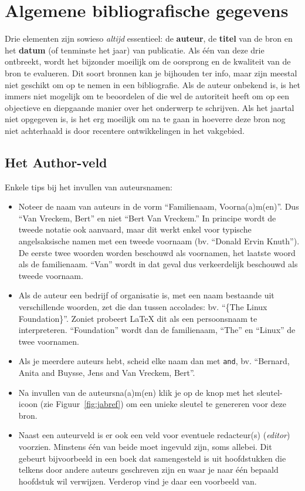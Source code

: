 \section{Algemene bibliografische gegevens}%
\label{sec:algemene_bibliografische_gegevens}

 Drie elementen zijn sowieso \emph{altijd} essentieel: de \textbf{auteur}, de \textbf{titel} van de bron en het \textbf{datum} (of tenminste het jaar) van publicatie. Als één van deze drie ontbreekt, wordt het bijzonder moeilijk om de oorsprong en de kwaliteit van de bron te evalueren. Dit soort bronnen kan je bijhouden ter info, maar zijn meestal niet geschikt om op te nemen in een bibliografie. Als de auteur onbekend is, is het immers niet mogelijk om te beoordelen of die wel de autoriteit heeft om op een objectieve en diepgaande manier over het onderwerp te schrijven. Als het jaartal niet opgegeven is, is het erg moeilijk om na te gaan in hoeverre deze bron nog niet achterhaald is door recentere ontwikkelingen in het vakgebied.

\subsection{Het Author-veld}%
\label{ssec:het_author_veld}

Enkele tips bij het invullen van auteursnamen:

\begin{itemize}
  \item Noteer de naam van auteurs in de vorm ``Familienaam, Voorna(a)m(en)''. Dus ``Van Vreckem, Bert'' en niet ``Bert Van Vreckem.'' In principe wordt de tweede notatie ook aanvaard, maar dit werkt enkel voor typische angelsaksische namen met een tweede voornaam (bv. ``Donald Ervin Knuth''). De eerste twee woorden worden beschouwd als voornamen, het laatste woord als de familienaam. ``Van'' wordt in dat geval dus verkeerdelijk beschouwd als tweede voornaam.
  \item Als de auteur een bedrijf of organisatie is, met een naam bestaande uit verschillende woorden, zet die dan tussen accolades: bv. ``\{The Linux Foundation\}''. Zoniet probeert {\LaTeX} dit als een persoonsnaam te interpreteren. ``Foundation'' wordt dan de familienaam, ``The'' en ``Linux'' de twee voornamen.
  \item Als je meerdere auteurs hebt, scheid elke naam dan met \texttt{and}, bv. ``Bernard, Anita and Buysse, Jens and Van Vreckem, Bert''.
  \item Na invullen van de auteursna(a)m(en) klik je op de knop met het sleutel-icoon (zie Figuur~\ref{fig:jabref}) om een unieke sleutel te genereren voor deze bron.
  \item Naast een auteurveld is er ook een veld voor eventuele redacteur(s) (\emph{editor}) voorzien. Minstens één van beide moet ingevuld zijn, soms allebei. Dit gebeurt bijvoorbeeld in een boek dat samengesteld is uit hoofdstukken die telkens door andere auteurs geschreven zijn en waar je naar één bepaald hoofdstuk wil verwijzen. Verderop vind je daar een voorbeeld van.
\end{itemize}

